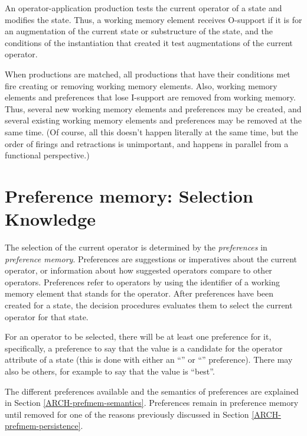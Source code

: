 An operator-application production tests the current operator of a state
and modifies the state. Thus, a working memory element receives
O-support if it is for an augmentation of the current state or
substructure of the state, and the conditions of the instantiation that
created it test augmentations of the current operator.  

When productions are matched, all productions that have their conditions
met fire creating or removing working memory elements.  Also, working
memory elements and preferences that lose I-support are removed from
working memory. Thus, several new working memory elements and
preferences may be created, and several existing working memory elements
and preferences may be removed at the same time.  (Of
course, all this doesn't happen literally at the same time, but the
order of firings and retractions is unimportant, and happens in parallel
from a functional perspective.)

\section{Preference memory: Selection Knowledge} 
\label{ARCH-prefmem}


The selection of the current operator is determined by the \emph{preferences} in
\emph{preference memory}. Preferences are suggestions or imperatives about the
current operator, or information about how suggested operators compare
to other operators.  Preferences refer to operators by using the
identifier of a working memory element that stands for the operator.
After preferences have been created for a state, the decision procedures
evaluates them to select the current operator for that state.

For an operator to be selected, there will be at least one preference
for it, specifically, a preference to say that the value is a candidate
for the operator attribute of a state (this is done with either an
``'' or ``'' preference). There may also
be others, for example to say that the value is ``best''.

The different preferences available and the semantics of preferences are
explained in Section \ref{ARCH-prefmem-semantics}. Preferences remain in
preference memory until removed for one of the reasons previously discussed in
Section \ref{ARCH-prefmem-persistence}.

